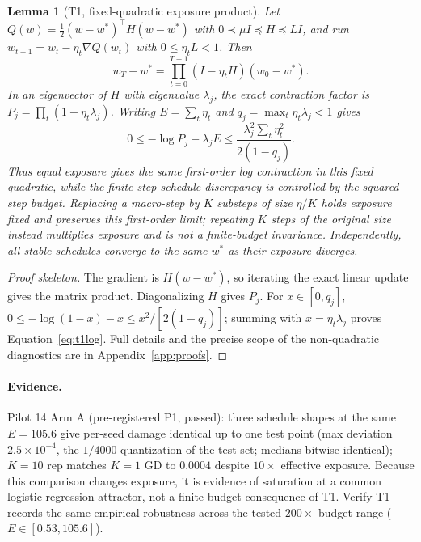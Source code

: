 \documentclass{article}
\newtheorem{lemma}{Lemma}
\newcommand{\Expo}{E}         %
\begin{document}
\begin{lemma}[T1, fixed-quadratic exposure product]
\label{thm:t1}
Let $Q(w)=\frac12(w-w^*)^\top H(w-w^*)$ with
$0\prec\mu I\preceq H\preceq LI$, and run
$w_{t+1}=w_t-\eta_t\nabla Q(w_t)$ with $0\leq\eta_tL<1$. Then
\begin{equation}
w_T-w^*=\prod_{t=0}^{T-1}(I-\eta_tH)(w_0-w^*).
\end{equation}
In an eigenvector of $H$ with eigenvalue $\lambda_j$, the exact contraction factor is
$P_j=\prod_t(1-\eta_t\lambda_j)$. Writing $\Expo=\sum_t\eta_t$ and
$q_j=\max_t\eta_t\lambda_j<1$ gives
\begin{equation}
0\leq-\log P_j-\lambda_j\Expo
\leq \frac{\lambda_j^2\sum_t\eta_t^2}{2(1-q_j)}.
\label{eq:t1log}
\end{equation}
Thus equal exposure gives the same first-order log contraction in this fixed quadratic, while
the finite-step schedule discrepancy is controlled by the squared-step budget. Replacing a
macro-step by $K$ substeps of size $\eta/K$ holds exposure fixed and preserves this first-order
limit; repeating $K$ steps of the original size instead multiplies exposure and is not a
finite-budget invariance. Independently, all stable schedules converge to the same $w^*$ as
their exposure diverges.
\end{lemma}

\begin{proof}[Proof skeleton]
The gradient is $H(w-w^*)$, so iterating the exact linear update gives the matrix product.
Diagonalizing $H$ gives $P_j$. For $x\in[0,q_j]$,
$0\leq-\log(1-x)-x\leq x^2/[2(1-q_j)]$; summing with
$x=\eta_t\lambda_j$ proves Equation~\ref{eq:t1log}. Full details and the precise scope of the
non-quadratic diagnostics are in Appendix~\ref{app:proofs}.
\end{proof}

\paragraph{Evidence.} Pilot 14 Arm A (pre-registered P1, passed): three schedule shapes at the
same $\Expo=105.6$ give per-seed damage identical up to one test point (max deviation
$2.5\times10^{-4}$, the $1/4000$ quantization of the test set; medians bitwise-identical);
$K=10$ rep matches $K=1$ GD to $0.0004$ despite $10\times$ effective exposure. Because this
comparison changes exposure, it is evidence of saturation at a common logistic-regression
attractor, not a finite-budget consequence of T1. Verify-T1 records the same empirical
robustness across the tested $200\times$ budget range ($\Expo\in[0.53,105.6]$).
\end{document}
